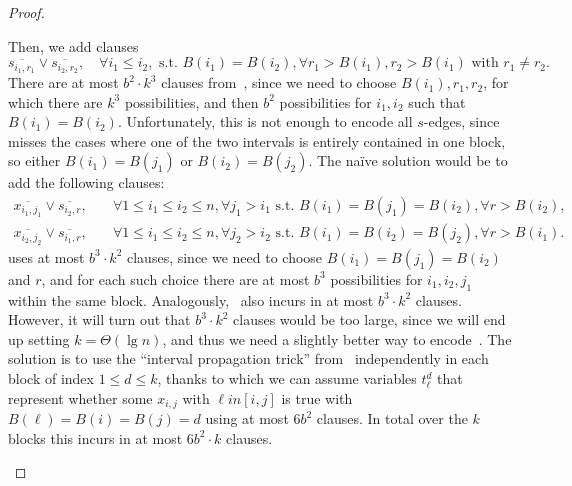 \documentclass[11pt]{article}
\begin{document}
\begin{proof}
\begin{itemize}
       Then, we add clauses 
       \begin{equation}\label{eq:intro-s}
       \overline{s_{i_1, r_1}} \lor \overline{s_{i_2, r_2}}, \quad \forall i_1 \leq i_2, \text{ s.t. } B(i_1) = B(i_2), \forall r_1 > B(i_1), r_2 > B(i_1) \text{ with } r_1 \neq r_2.
       \end{equation}
        There are at most $b^2 \cdot k^3$ clauses from~, since we need to choose $B(i_1), r_1, r_2$, for which there are $k^3$ possibilities, and then $b^2$ possibilities for $i_1, i_2$ such that $B(i_1) = B(i_2)$.
        Unfortunately, this is not enough to encode all $s$-edges, since~ misses the cases where one of the two intervals is entirely contained in one block, so either $B(i_1) = B(j_1)$ or $B(i_2) = B(j_2)$.
        The naïve solution would be to add the following clauses:
        \begin{align}
        \overline{x_{i_1, j_1}} \lor \overline{s_{i_2, r}},& \quad \forall 1 \leq i_1 \leq i_2 \leq n, \forall j_1 > i_1 \text{ s.t. } B(i_1) = B(j_1) = B(i_2), \forall r > B(i_2),\label{eq:intro-s2}\\
        \overline{x_{i_2, j_2}} \lor \overline{s_{i_1, r}},& \quad \forall 1 \leq i_1 \leq i_2 \leq n, \forall j_2 > i_2 \text{ s.t. } B(i_1) = B(i_2) = B(j_2), \forall r > B(i_1).\label{eq:intro-s3}
        \end{align}
         uses at most $b^3 \cdot k^2$ clauses, since we need to choose $B(i_1) = B(j_1) = B(i_2)$ and $r$, and for each such choice there are at most $b^3$ possibilities for $i_1, i_2, j_1$ within the same block.
        Analogously,~ also incurs in at most $b^3 \cdot k^2$ clauses.
        However, it will turn out that $b^3 \cdot k^2$ clauses would be too large, since we will end up setting $k = \Theta(\lg n)$, and thus we need a slightly better way to encode~.
        The solution is to use the ``interval propagation trick'' from~ independently in each block of index $1 \leq d \leq k$, thanks to which we can assume variables $t^{d}_\ell$ that represent whether some $x_{i, j}$ with $\ell in [i, j]$ is true with $B(\ell) = B(i) = B(j) = d$ using at most $6b^2$ clauses. In total over the $k$ blocks this incurs in at most $6b^2 \cdot k$ clauses.

\end{itemize}
\end{proof}
\end{document}
